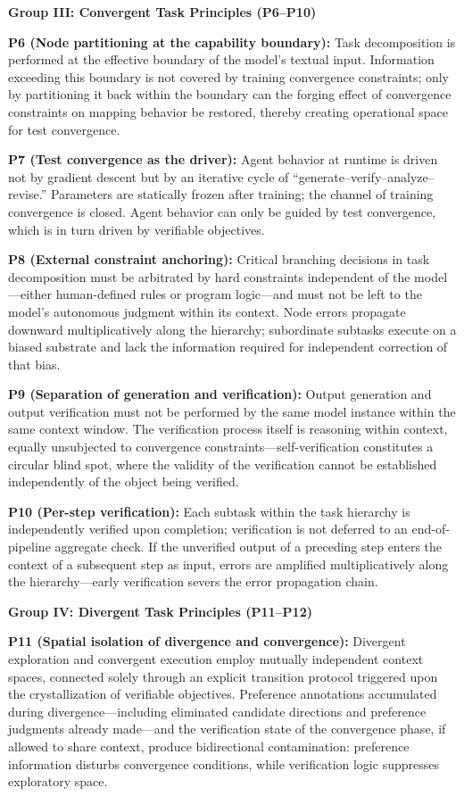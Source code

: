 \documentclass[11pt,a4paper]{article}
\theoremstyle{definition}
\begin{document}
\medskip
\textbf{Group III: Convergent Task Principles (P6--P10)}

\textbf{P6 (Node partitioning at the capability boundary):} Task decomposition is performed at the effective boundary of the model's textual input. Information exceeding this boundary is not covered by training convergence constraints; only by partitioning it back within the boundary can the forging effect of convergence constraints on mapping behavior be restored, thereby creating operational space for test convergence.

\textbf{P7 (Test convergence as the driver):} Agent behavior at runtime is driven not by gradient descent but by an iterative cycle of ``generate--verify--analyze--revise.'' Parameters are statically frozen after training; the channel of training convergence is closed. Agent behavior can only be guided by test convergence, which is in turn driven by verifiable objectives.

\textbf{P8 (External constraint anchoring):} Critical branching decisions in task decomposition must be arbitrated by hard constraints independent of the model---either human-defined rules or program logic---and must not be left to the model's autonomous judgment within its context. Node errors propagate downward multiplicatively along the hierarchy; subordinate subtasks execute on a biased substrate and lack the information required for independent correction of that bias.

\textbf{P9 (Separation of generation and verification):} Output generation and output verification must not be performed by the same model instance within the same context window. The verification process itself is reasoning within context, equally unsubjected to convergence constraints---self-verification constitutes a circular blind spot, where the validity of the verification cannot be established independently of the object being verified.

\textbf{P10 (Per-step verification):} Each subtask within the task hierarchy is independently verified upon completion; verification is not deferred to an end-of-pipeline aggregate check. If the unverified output of a preceding step enters the context of a subsequent step as input, errors are amplified multiplicatively along the hierarchy---early verification severs the error propagation chain.

\medskip
\textbf{Group IV: Divergent Task Principles (P11--P12)}

\textbf{P11 (Spatial isolation of divergence and convergence):} Divergent exploration and convergent execution employ mutually independent context spaces, connected solely through an explicit transition protocol triggered upon the crystallization of verifiable objectives. Preference annotations accumulated during divergence---including eliminated candidate directions and preference judgments already made---and the verification state of the convergence phase, if allowed to share context, produce bidirectional contamination: preference information disturbs convergence conditions, while verification logic suppresses exploratory space.
\end{document}
